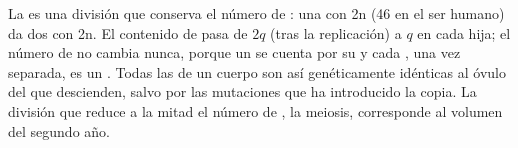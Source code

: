 \begin{proposition}\label{prop:b1:replication-mitosis:conserves}
La  es una división que conserva el número de : una 
con 2n  (46 en el ser humano) da dos  con 2n. El contenido
de  pasa de $2q$ (tras la replicación) a $q$ en cada hija; el número de
 no cambia nunca, porque un  se cuenta por su 
y cada , una vez separada, es un . Todas las  de un
cuerpo son así genéticamente idénticas al óvulo del que descienden, salvo
por las mutaciones que ha introducido la copia. La división que reduce a la
mitad el número de , la meiosis, corresponde al volumen del
segundo año.
\end{proposition}

